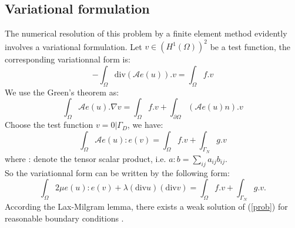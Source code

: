 \documentclass[notitlepage,a4paper,fleqn,9pt]{icmfarticle}
\begin{document}
\begin{multicols}{2}
\subsection{Variational formulation}
The numerical resolution of this problem by a finite element method evidently involves a variational formulation. Let $v \in (H^1(\Omega))^2$ be a test function, the corresponding variationnal form is:
$$-\int_\Omega\text{div}(\mathcal{A}e(u)).v = \int_\Omega f.v$$
We use the Green's theorem as:
$$\int_\Omega\mathcal{A}e(u).\nabla v = \int_\Omega f.v + \int_{\partial \Omega}(\mathcal{A}e(u)n).v$$
Choose the test function $v = 0|\Gamma_D$, we have:
$$\int_\Omega\mathcal{A}e(u):e(v) = \int_\Omega f.v + \int_{\Gamma_N}g.v$$
where : denote the tensor scalar product, i.e. $a : b = \sum_{ij}{a_{ij}b_{ij}}.$ \\
So the variationnal form can be written by the following form:
$$\int_\Omega 2\mu e(u) : e(v) + \lambda(\text{div}u)(\text{div}v) = \int_\Omega f.v + \int_{\Gamma_N}g.v.$$
According the Lax-Milgram lemma, there exists a weak solution of (\ref{prob}) for reasonable boundary conditions \cite{LAX-1994, LAX-1987}.

\end{multicols}
\end{document}
